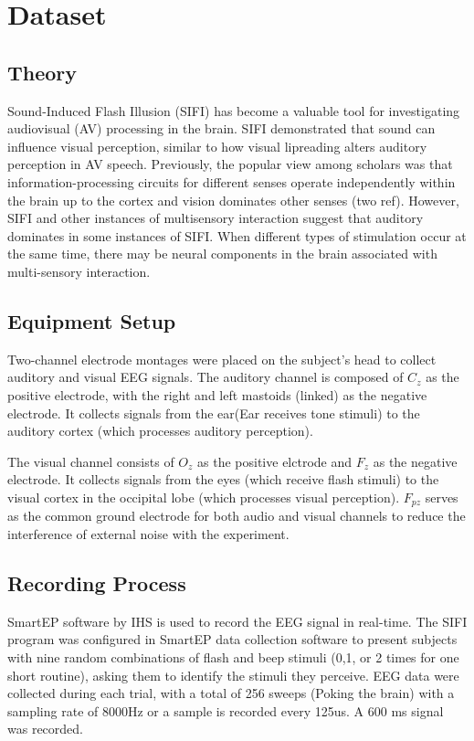 \documentclass{article}
\begin{document}
	
	\section{Dataset}
	\subsection{Theory}
	Sound-Induced Flash Illusion (SIFI) has become a valuable tool for investigating audiovisual (AV) processing in the brain. SIFI demonstrated that sound can influence visual perception, similar to how visual lipreading alters auditory perception in AV speech. Previously, the popular view among scholars was that information-processing circuits for different senses operate independently within the brain up to the cortex and vision dominates other senses (two ref). However, SIFI and other instances of multisensory interaction suggest that auditory dominates in some instances of SIFI. When different types of stimulation occur at the same time, there may be neural components in the brain associated with multi-sensory interaction.
	
	\subsection{Equipment Setup}
	Two-channel electrode montages were placed on the subject's head to collect auditory and visual EEG signals. The auditory channel is composed of $C_z$ as the positive electrode, with the right and left mastoids (linked) as the negative electrode. It collects signals from the ear(Ear receives tone stimuli) to the auditory cortex (which processes auditory perception).
	
	The visual channel consists of $O_z$ as the positive elctrode and $F_z$ as the negative electrode. It collects signals from the eyes (which receive flash stimuli) to the visual cortex in the occipital lobe (which processes visual perception). $F_{pz}$ serves as the common ground electrode for both audio and visual channels to reduce the interference of external noise with the experiment.
	
	\subsection{Recording Process}
	SmartEP software by IHS is used to record the EEG signal in real-time. The SIFI program was configured in SmartEP data collection software to present subjects with nine random combinations of flash and beep stimuli (0,1, or 2 times for one short routine), asking them to identify the stimuli they perceive. EEG data were collected during each trial, with a total of 256 sweeps (Poking the brain) with a sampling rate of 8000Hz or a sample is recorded every 125us. A 600 ms signal was recorded.
	
\end{document}
